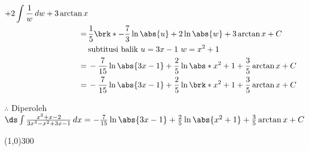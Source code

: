 \begin{enumerate}[leftmargin=*, label={\arabic*}.]
\begin{enumerate}[label={\alph*}.]
\begin{align*}
{        +2\int\frac{1}{w}\,dw+3\arctan x}\\
        =\,&\frac{1}{5}\brk*{-\frac{7}{3}\ln\abs{u}
        +2\ln\abs{w}+3\arctan x}+C\\
        &\text{subtitusi balik $u=3x-1$ $w=x^{2}+1$}\\
        =\,&-\frac{7}{15}\ln\abs{3x-1}
        +\frac{2}{5}\ln\abs*{x^{2}+1}+\frac{3}{5}\arctan x+C\\
        =\,&-\frac{7}{15}\ln\abs{3x-1}
        +\frac{2}{5}\ln\brk*{x^{2}+1}+\frac{3}{5}\arctan x+C
    \end{align*}

    $\therefore$ Diperoleh $\ds\int \frac{x^{2}+x-2}{3x^{3}-x^{2}+3x-1}\,dx
    =-\frac{7}{15}\ln\abs{3x-1}
        +\frac{2}{5}\ln\abs{x^{2}+1}+\frac{3}{5}\arctan x+C$
\end{enumerate}
\end{enumerate}

\begin{center}
    \line(1,0){300}
\end{center}